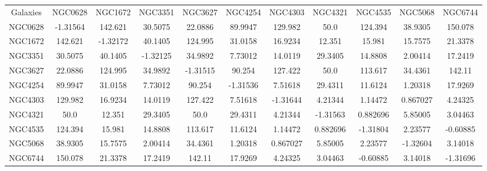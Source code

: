 \begin{table}
\begin{tabular}{ccccccccccc}
Galaxies & NGC0628 & NGC1672 & NGC3351 & NGC3627 & NGC4254 & NGC4303 & NGC4321 & NGC4535 & NGC5068 & NGC6744 \\
NGC0628 & -1.31564 & 142.621 & 30.5075 & 22.0886 & 89.9947 & 129.982 & 50.0 & 124.394 & 38.9305 & 150.078 \\
NGC1672 & 142.621 & -1.32172 & 40.1405 & 124.995 & 31.0158 & 16.9234 & 12.351 & 15.981 & 15.7575 & 21.3378 \\
NGC3351 & 30.5075 & 40.1405 & -1.32125 & 34.9892 & 7.73012 & 14.0119 & 29.3405 & 14.8808 & 2.00414 & 17.2419 \\
NGC3627 & 22.0886 & 124.995 & 34.9892 & -1.31515 & 90.254 & 127.422 & 50.0 & 113.617 & 34.4361 & 142.11 \\
NGC4254 & 89.9947 & 31.0158 & 7.73012 & 90.254 & -1.31536 & 7.51618 & 29.4311 & 11.6124 & 1.20318 & 17.9269 \\
NGC4303 & 129.982 & 16.9234 & 14.0119 & 127.422 & 7.51618 & -1.31644 & 4.21344 & 1.14472 & 0.867027 & 4.24325 \\
NGC4321 & 50.0 & 12.351 & 29.3405 & 50.0 & 29.4311 & 4.21344 & -1.31563 & 0.882696 & 5.85005 & 3.04463 \\
NGC4535 & 124.394 & 15.981 & 14.8808 & 113.617 & 11.6124 & 1.14472 & 0.882696 & -1.31804 & 2.23577 & -0.60885 \\
NGC5068 & 38.9305 & 15.7575 & 2.00414 & 34.4361 & 1.20318 & 0.867027 & 5.85005 & 2.23577 & -1.32604 & 3.14018 \\
NGC6744 & 150.078 & 21.3378 & 17.2419 & 142.11 & 17.9269 & 4.24325 & 3.04463 & -0.60885 & 3.14018 & -1.31696 \\
\end{tabular}
\end{table}
